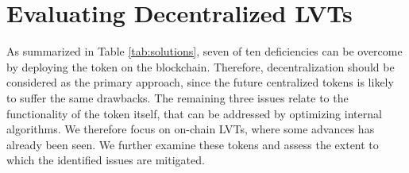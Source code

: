 \section{Evaluating Decentralized LVTs}\label{sec:evaluation}
As summarized in Table \ref{tab:solutions}, seven of ten deficiencies can be overcome by deploying the token on the blockchain. Therefore, decentralization should be considered as the primary approach, since the future centralized tokens is likely to suffer the same drawbacks. The remaining three issues relate to the functionality of the token itself, that can be addressed by optimizing internal algorithms. We  therefore focus on on-chain LVTs, where some advances has already been seen. We further examine these tokens and assess the extent to which the identified issues are mitigated.


